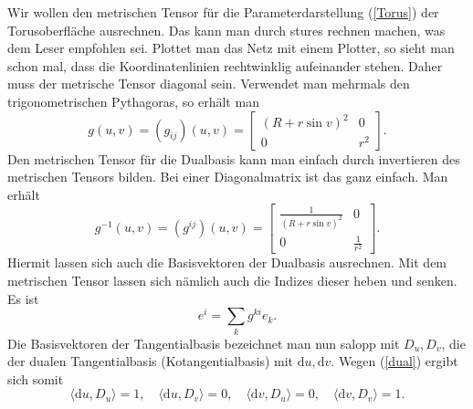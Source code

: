 \documentclass[a4paper,12pt,fleqn]{article}
\begin{document}
Wir wollen den metrischen Tensor für die Parameterdarstellung
(\ref{Torus}) der Torusoberfläche ausrechnen. Das kann man
durch stures rechnen
machen, was dem Leser empfohlen sei. Plottet man das Netz mit
einem Plotter, so sieht man schon mal, dass die Koordinatenlinien
rechtwinklig aufeinander stehen. Daher muss der metrische Tensor
diagonal sein. Verwendet man mehrmals den trigonometrischen
Pythagoras, so erhält man
\begin{equation}
g(u,v) = (g_{ij})(u,v)= \begin{bmatrix}
(R+r\sin v)^2 & 0\\
0 & r^2
\end{bmatrix}.
\end{equation}
Den metrischen Tensor für die Dualbasis kann man einfach durch
invertieren des metrischen Tensors bilden. Bei einer Diagonalmatrix
ist das ganz einfach. Man erhält
\begin{equation}
g^{-1}(u,v) = (g^{ij})(u,v)= \begin{bmatrix}
\frac{1}{(R+r\sin v)^2} & 0\\
0 & \frac{1}{r^2}
\end{bmatrix}.
\end{equation}
Hiermit lassen sich auch die Basisvektoren der Dualbasis ausrechnen.
Mit dem metrischen Tensor lassen sich nämlich auch die Indizes
dieser heben und senken. Es ist
\begin{equation}\label{Bvheben}
e^i = \sum_{k} g^{ki}e_k.
\end{equation}
Die Basisvektoren der Tangentialbasis bezeichnet man nun salopp
mit \(D_u,D_v\), die der dualen Tangentialbasis (Kotangentialbasis)
mit \(\mathrm du,\mathrm dv\). Wegen (\ref{dual}) ergibt sich
somit
\begin{equation}\label{Tdual}
\langle\mathrm du,D_u\rangle=1,\quad
\langle\mathrm du,D_v\rangle=0,\quad
\langle\mathrm dv,D_u\rangle=0,\quad
\langle\mathrm dv,D_v\rangle=1.
\end{equation}
\end{document}
